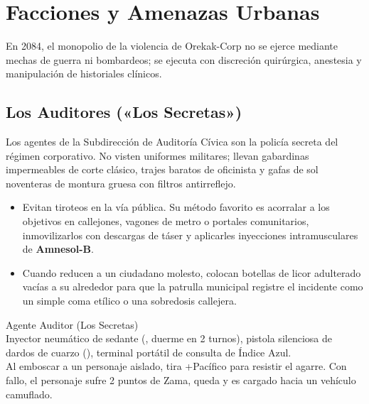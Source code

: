 \chapter{Facciones y Amenazas Urbanas}

En 2084, el monopolio de la violencia de Orekak-Corp no se ejerce mediante mechas de guerra ni bombardeos; se ejecuta con discreción quirúrgica, anestesia y manipulación de historiales clínicos.

\section{Los Auditores («Los Secretas»)}


Los agentes de la Subdirección de Auditoría Cívica son la policía secreta del régimen corporativo. No visten uniformes militares; llevan gabardinas impermeables de corte clásico, trajes baratos de oficinista y gafas de sol noventeras de montura gruesa con filtros antirreflejo.

\begin{itemize}
  \item {} Evitan tiroteos en la vía pública. Su método favorito es acorralar a los objetivos en callejones, vagones de metro o portales comunitarios, inmovilizarlos con descargas de táser y aplicarles inyecciones intramusculares de \textbf{Amnesol-B}.
  \item {} Cuando reducen a un ciudadano molesto, colocan botellas de licor adulterado vacías a su alrededor para que la patrulla municipal registre el incidente como un simple coma etílico o una sobredosis callejera.
\end{itemize}

\begin{FichaEnemigo}{Agente Auditor (Los Secretas)}
    \\
 Inyector neumático de sedante (, duerme en 2 turnos), pistola silenciosa de dardos de cuarzo (), terminal portátil de consulta de Índice Azul.\\
 Al emboscar a un personaje aislado, tira +Pacífico para resistir el agarre. Con fallo, el personaje sufre 2 puntos de Zama, queda  y es cargado hacia un vehículo camuflado.
\end{FichaEnemigo}

